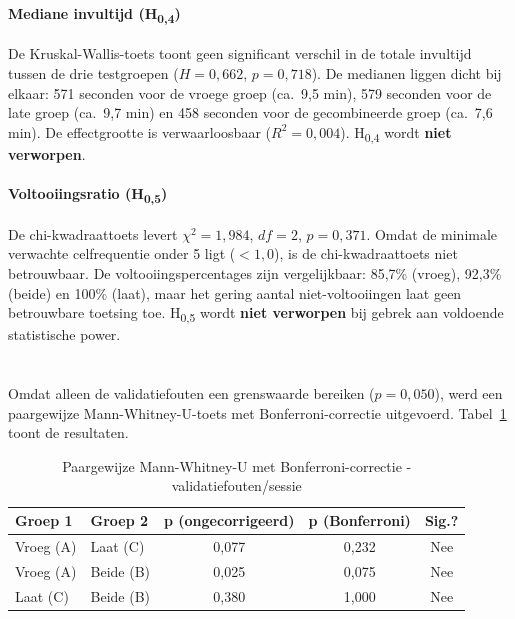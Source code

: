 \paragraph{Mediane invultijd (H\textsubscript{0,4})}
De Kruskal-Wallis-toets toont geen significant verschil in de totale invultijd tussen de drie testgroepen ($H = 0{,}662$, $p = 0{,}718$). De medianen liggen dicht bij elkaar: 571 seconden voor de vroege groep (ca.\ 9,5 min), 579 seconden voor de late groep (ca.\ 9,7 min) en 458 seconden voor de gecombineerde groep (ca.\ 7,6 min). De effectgrootte is verwaarloosbaar ($R^2 = 0{,}004$). H\textsubscript{0,4} wordt \textbf{niet verworpen}.

\paragraph{Voltooiingsratio (H\textsubscript{0,5})}
De chi-kwadraattoets levert $\chi^2 = 1{,}984$, $df = 2$, $p = 0{,}371$. Omdat de minimale verwachte celfrequentie onder 5 ligt ($< 1{,}0$), is de chi-kwadraattoets niet betrouwbaar. De voltooiingspercentages zijn vergelijkbaar: 85,7\% (vroeg), 92,3\% (beide) en 100\% (laat), maar het gering aantal niet-voltooiingen laat geen betrouwbare toetsing toe. H\textsubscript{0,5} wordt \textbf{niet verworpen} bij gebrek aan voldoende statistische power.

\section{}

Omdat alleen de validatiefouten een grenswaarde bereiken ($p = 0{,}050$), werd een paargewijze Mann-Whitney-U-toets met Bonferroni-correctie uitgevoerd. Tabel~\ref{tab:posthoc-fouten} toont de resultaten.

\begin{table}[h]
  \centering
  \caption[Post-hoc analyse validatiefouten]{Paargewijze Mann-Whitney-U met Bonferroni-correctie - validatiefouten/sessie}
  \label{tab:posthoc-fouten}
  \begin{tabular}{llccc}
    \hline
    \textbf{Groep 1} & \textbf{Groep 2} & \textbf{p (ongecorrigeerd)} & \textbf{p (Bonferroni)} & \textbf{Sig.?} \\
    \hline
    Vroeg (A) & Laat (C)  & 0,077 & 0,232 & Nee \\
    Vroeg (A) & Beide (B) & 0,025 & 0,075 & Nee \\
    Laat (C)  & Beide (B) & 0,380 & 1,000 & Nee \\
    \hline
  \end{tabular}
\end{table}

